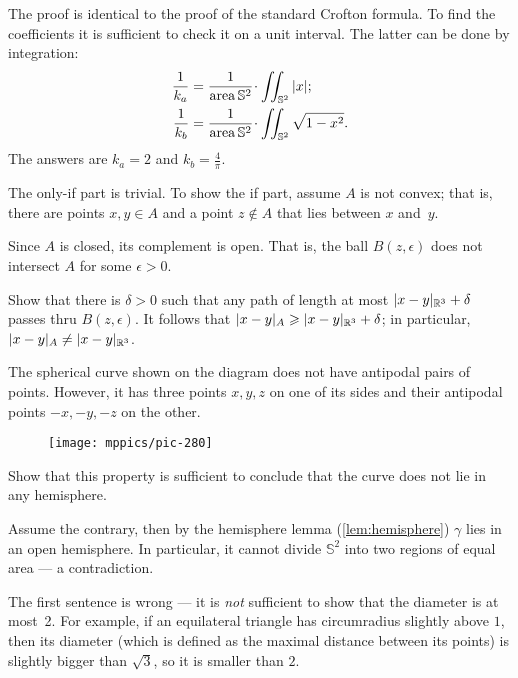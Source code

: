 \begin{multicols}{2}
The proof is identical to the proof of the standard Crofton formula.
To find the coefficients it is sufficient to check it on a unit interval.
The latter can be done by integration:
\begin{align*}
\frac1{k_a}&=\frac{1}{\area \mathbb{S}^2}\cdot\iint_{\mathbb{S}^2} |x|;
\\
\frac1{k_b}&=\frac{1}{\area \mathbb{S}^2}\cdot\iint_{\mathbb{S}^2} \sqrt{1-x^2}.
\end{align*}
The answers are $k_a=2$ and $k_b=\tfrac4\pi$.

The only-if part is trivial.
To show the if part, assume $A$ is not convex;
that is, there are points $x,y\in A$ and a point $z\notin A$ that lies between $x$ and~$y$.

Since $A$ is closed, its complement is open.
That is, the ball $B(z,\epsilon)$ does not intersect $A$ for some $\epsilon>0$.

Show that there is $\delta>0$ such that any path of length at most $\dist{x}{y}{\mathbb{R}^3}+\delta$ passes thru $B(z,\epsilon)$.
It follows that $\dist{x}{y}A\ge \dist{x}{y}{\mathbb{R}^3}+\delta$; 
in particular, $\dist{x}{y}A\ne \dist{x}{y}{\mathbb{R}^3}$.

The spherical curve shown on the diagram does not have antipodal pairs of points.
However, it has three points $x,y,z$ on one of its sides and their antipodal points $-x,-y,-z$ on the other.

\begin{wrapfigure}[6]{r}{23 mm}
\vskip-6mm
\centering
\texttt{[image: mppics/pic-280]}
\vskip0mm
\end{wrapfigure}

Show that this property is sufficient to conclude that the curve does not lie in any hemisphere.

Assume the contrary, then by the hemisphere lemma (\ref{lem:hemisphere}) $\gamma$ lies in an open hemisphere.
In particular, it cannot divide $\mathbb{S}^2$ into two regions of equal area --- a contradiction.

The first sentence is wrong --- it is \textit{not} sufficient to show that the diameter is at most~2.
For example, if an equilateral triangle has circumradius slightly above $1$,
then its diameter (which is defined as the maximal distance between its points) is slightly bigger than $\sqrt3$, so it is smaller than $2$.


\end{multicols}
